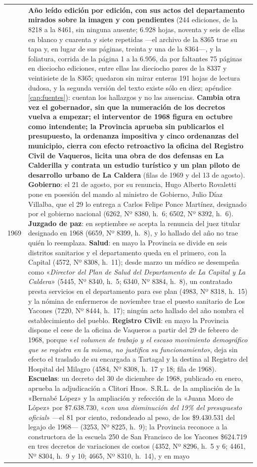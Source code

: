 \begin{longtable}{@{}p{2.7cm}p{10.3cm}@{}}
1969 & \textbf{Año leído edición por edición, con sus actos del departamento mirados sobre la imagen y con pendientes} (244 ediciones, de la 8218 a la 8461, sin ninguna ausente; 6.928 hojas, noventa y seis de ellas en blanco y cuarenta y siete repetidas ---el archivo de la 8365 trae su tapa y, en lugar de sus páginas, treinta y una de la 8364---, y la foliatura, corrida de la página 1 a la 6.956, da por faltantes 75 páginas en dieciocho ediciones, entre ellas las dieciocho pares de la 8337 y veintisiete de la 8365; quedaron sin mirar enteras 191 hojas de lectura dudosa, y la segunda versión del texto existe sólo en diez; apéndice \ref{cap:fuentes}): cuentan los hallazgos y no las ausencias. \textbf{Cambia otra vez el gobernador, sin que la numeración de los decretos vuelva a empezar; el interventor de 1968 figura en octubre como intendente; la Provincia aprueba sin publicarlos el presupuesto, la ordenanza impositiva y cinco ordenanzas del municipio, cierra con efecto retroactivo la oficina del Registro Civil de Vaqueros, licita una obra de dos defensas en La Calderilla y contrata un estudio turístico y un plan piloto de desarrollo urbano de La Caldera} (filas de 1969 y del 13 de agosto). \textbf{Gobierno}: el 21 de agosto, por su renuncia, Hugo Alberto Rovaletti pone en posesión del mando al ministro de Gobierno, Julio Díaz Villalba, que el 29 lo entrega a Carlos Felipe Ponce Martínez, designado por el gobierno nacional (6262, Nº 8380, h.\ 6; 6502, Nº 8392, h.\ 6). \textbf{Juzgado de paz}: en septiembre se acepta la renuncia del juez titular designado en 1968 (6659, Nº 8399, h.\ 8), y lo hallado del año no trae quién lo reemplaza. \textbf{Salud}: en mayo la Provincia se divide en seis distritos sanitarios y el departamento queda en el primero, con la Capital (4572, Nº 8308, h.\ 11); desde marzo un médico se desempeña como «\textit{Director del Plan de Salud del Departamento de La Capital y La Caldera}» (5445, Nº 8340, h.\ 5; 6340, Nº 8384, h.\ 8), un contratado presta servicios en el departamento para ese plan (4983, Nº 8318, h.\ 15) y la nómina de enfermeros de noviembre trae el puesto sanitario de Los Yacones (7220, Nº 8444, h.\ 17); ningún acto hallado del año nombra el establecimiento del pueblo. \textbf{Registro Civil}: en mayo la Provincia dispone el cese de la oficina de Vaqueros a partir del 29 de febrero de 1968, porque «\textit{el volumen de trabajo y el escaso movimiento demográfico que se registra en la misma, no justifica su funcionamiento}», deja sin efecto el traslado de su encargada a Tartagal y la destina al Registro del Hospital del Milagro (4584, Nº 8308, h.\ 17 y 18; fila de 1968). \textbf{Escuelas}: un decreto del 30 de diciembre de 1968, publicado en enero, aprueba la adjudicación a Clitori Hnos.\ S.R.L.\ de la ampliación de la «Bernabé López» y la ampliación y refección de la «Juana Moro de López» por \$7.638.730, «\textit{con una disminución del 19\% del presupuesto oficial}» ---el 81 por ciento, redondeado al peso, de los \$9.430.531 del legajo de 1968--- (3253, Nº 8225, h.\ 9); la Provincia reconoce a la constructora de la escuela 250 de San Francisco de los Yacones \$624.719 en tres decretos de variaciones de costos (4352, Nº 8296, h.\ 5 y 6; 4461, Nº 8304, h.\ 9 y 10; 4665, Nº 8310, h.\ 14), y en mayo 
\end{longtable}
